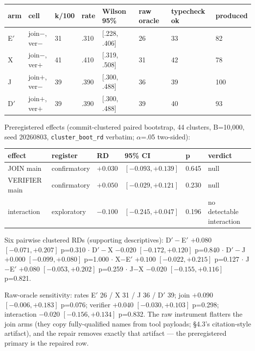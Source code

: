\documentclass[10pt]{article}
\newcommand{\code}[1]{\texttt{#1}}
\begin{document}
\begin{center}\footnotesize
\begin{tabular}{@{}llllllll@{}}
\toprule
arm & cell & k/100 & rate & Wilson 95\% & raw oracle & typecheck ok & produced \\
\midrule
E$'$ & join$-$, ver$-$ & 31 & .310 & [.228, .406] & 26 & 33 & 82 \\
X & join$-$, ver$+$ & 41 & .410 & [.319, .508] & 31 & 42 & 78 \\
J & join$+$, ver$-$ & 39 & .390 & [.300, .488] & 36 & 39 & 100 \\
D$'$ & join$+$, ver$+$ & 39 & .390 & [.300, .488] & 39 & 40 & 93 \\
\bottomrule
\end{tabular}
\end{center}

Preregistered effects (commit-clustered paired bootstrap, 44 clusters,
B=10{,}000, seed 20260803, \code{cluster\_boot\_rd} verbatim;
$\alpha$=.05 two-sided):

\begin{center}\footnotesize
\begin{tabular}{@{}llllll@{}}
\toprule
effect & register & RD & 95\% CI & p & verdict \\
\midrule
JOIN main & confirmatory & $+0.030$ & $[-0.093, +0.139]$ & 0.645 & null \\
VERIFIER main & confirmatory & $+0.050$ & $[-0.029, +0.121]$ & 0.230 & null \\
interaction & exploratory & $-0.100$ & $[-0.245, +0.047]$ & 0.196 & no detectable interaction \\
\bottomrule
\end{tabular}
\end{center}

Six pairwise clustered RDs (supporting descriptives): D$'-$E$'$
$+0.080$ $[-0.071, +0.207]$ p=0.310 $\cdot$ D$'-$X $-0.020$
$[-0.172, +0.120]$ p=0.840 $\cdot$ D$'-$J $+0.000$ $[-0.099, +0.080]$
p=1.000 $\cdot$ X$-$E$'$ $+0.100$ $[-0.022, +0.215]$ p=0.127 $\cdot$
J$-$E$'$ $+0.080$ $[-0.053, +0.202]$ p=0.259 $\cdot$ J$-$X $-0.020$
$[-0.155, +0.116]$ p=0.821.

Raw-oracle sensitivity: rates E$'$ 26 / X 31 / J 36 / D$'$ 39; join
$+0.090$ $[-0.006, +0.183]$ p=0.076; verifier $+0.040$
$[-0.030, +0.103]$ p=0.298; interaction $-0.020$ $[-0.156, +0.134]$
p=0.832. The raw instrument flatters the join arms (they copy
fully-qualified names from tool payloads; \S 4.3's citation-style
artifact), and the repair removes exactly that artifact --- the
preregistered primary is the repaired row.
\end{document}
